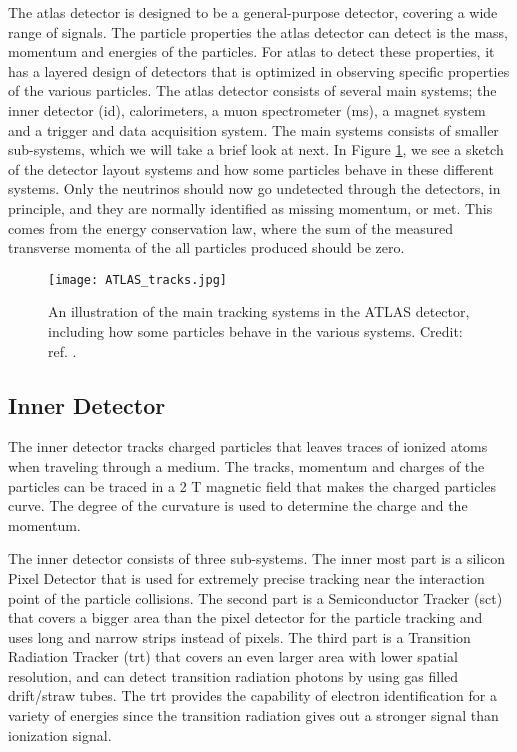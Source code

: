 \documentclass[a4paper, american, 12pt]{report}
\begin{document}
	The \acrshort{atlas} detector is designed to be a general-purpose detector, covering a wide range of signals. The particle properties the \acrshort{atlas} detector can detect is the mass, momentum and energies of the particles. For \acrshort{atlas} to detect these properties, it has a layered design of detectors that is optimized in observing specific properties of the various particles. The \acrshort{atlas} detector consists of several main systems; the inner detector (\acrshort{id}), calorimeters, a muon spectrometer (\acrshort{ms}), a magnet system and a trigger and data acquisition system. The main systems consists of smaller sub-systems, which we will take a brief look at next. In Figure \ref{fig:ATLAStracking}, we see a sketch of the detector layout systems and how some particles behave in these different systems. Only the neutrinos should now go undetected through the detectors, in principle, and they are normally identified as missing momentum, or \acrshort{met}. This comes from the energy conservation law, where the sum of the measured transverse momenta of the all particles produced should be zero. 
	\begin{figure}[ht!]
		\centering\texttt{[image: ATLAS\_tracks.jpg]}
		\caption[The ATLAS detector tracking system.]{An illustration of the main tracking systems in the ATLAS detector, including how some particles behave in the various systems. Credit: ref. \cite{ATLAStracking}.\label{fig:ATLAStracking}}
	\end{figure} 
	
	
	\subsection{Inner Detector}
	\label{subsect:Theory-InnerDetector}
	The inner detector tracks charged particles that leaves traces of ionized atoms when traveling through a medium. The tracks, momentum and charges of the particles can be traced in a 2 T magnetic field that makes the charged particles curve. The degree of the curvature is used to determine the charge and the momentum. 
	
	The inner detector consists of three sub-systems. The inner most part is a silicon Pixel Detector that is used for extremely precise tracking near the interaction point of the particle collisions. The second part is a Semiconductor Tracker (\acrshort{sct}) that covers a bigger area than the pixel detector for the particle tracking and uses long and narrow strips instead of pixels. The third part is a Transition Radiation Tracker (\acrshort{trt}) that covers an even larger area with lower spatial resolution, and can detect transition radiation photons by using gas filled drift/straw tubes. The \acrshort{trt} provides the capability of electron identification for a variety of energies since the transition radiation gives out a stronger signal than ionization signal.
	
\end{document}
